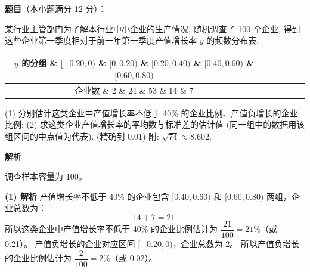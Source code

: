 \begin{answer}

\textbf{题目}（本小题满分 12 分）：

某行业主管部门为了解本行业中小企业的生产情况, 随机调查了 100 个企业, 得到这些企业第一季度相对于前一年第一季度产值增长率 $y$ 的频数分布表.
\begin{center}
\begin{tabular}{|c|c|c|c|c|c|}
\hline
$y$ 的分组 \& $[-0.20, 0)$ \& $[0, 0.20)$ \& $[0.20, 0.40)$ \& $[0.40, 0.60)$ \& $[0.60, 0.80)$ \\
\hline
企业数 \& 2 \& 24 \& 53 \& 14 \& 7 \\
\hline
\end{tabular}
\end{center}
(1) 分别估计这类企业中产值增长率不低于 40\% 的企业比例、产值负增长的企业比例;
(2) 求这类企业产值增长率的平均数与标准差的估计值 (同一组中的数据用该组区间的中点值为代表). (精确到 0.01)
附: $\sqrt{74} \approx 8.602$.

\textbf{解析}

调查样本容量为 100。

\textbf{(1) 解析}
产值增长率不低于 40\% 的企业包含 $[0.40, 0.60)$ 和 $[0.60, 0.80)$ 两组，企业总数为：
\nopagebreak[4]
\[14 + 7 = 21.\]
所以这类企业中产值增长率不低于 40\% 的企业比例估计为 $\dfrac{21}{100} = 21\%$（或 0.21）。
产值负增长的企业对应区间 $[-0.20, 0)$，企业总数为 2。
所以产值负增长的企业比例估计为 $\dfrac{2}{100} = 2\%$（或 0.02）。


\end{answer}
